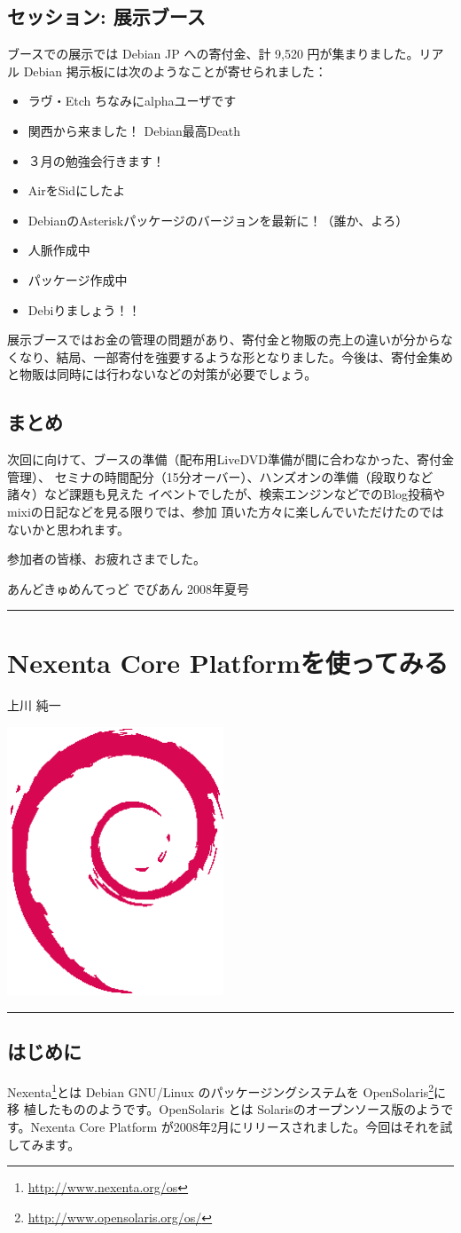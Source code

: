 \documentclass[mingoth,a4paper]{jsarticle}
\renewcommand{\dancersection}[2]{%
\newpage
あんどきゅめんてっど でびあん 2008年夏号
%
\vspace{0.1mm}\\
{\color{dancerlightblue}\rule{\hsize}{2mm}}

%
%
\begin{minipage}[t]{0.6\hsize}
\color{dancerdarkblue}
\vspace{1cm}
\section{#1}
\hfill{}#2\\
\end{minipage}
\begin{minipage}[t]{0.4\hsize}
\vspace{-2cm}
\hfill{}\includegraphics[height=8cm]{image200502/openlogo-nd.eps}\\
\vspace{-5cm}
\end{minipage}
%
%
{\color{dancerdarkblue}\rule{0.74\hsize}{2mm}}
%
\vspace{2cm}
}
\begin{document}
\subsection{セッション: 展示ブース}
ブースでの展示では Debian JP への寄付金、計 9,520 円が集まりました。リアル Debian 掲示板には次のようなことが寄せられました：
\begin{multicols}{2}
 
 \begin{itemize}
    \item ラヴ・Etch ちなみにalphaユーザです
    \item 関西から来ました！ Debian最高Death
    \item ３月の勉強会行きます！
    \item AirをSidにしたよ
    \item DebianのAsteriskパッケージのバージョンを最新に！（誰か、よろ）
    \item 人脈作成中
    \item パッケージ作成中
    \item Debiりましょう！！
 \end{itemize}
\end{multicols}

展示ブースではお金の管理の問題があり、寄付金と物販の売上の違いが分からなくなり、結局、一部寄付を強要するような形となりました。今後は、寄付金集めと物販は同時には行わないなどの対策が必要でしょう。


\subsection{まとめ}
次回に向けて、ブースの準備（配布用LiveDVD準備が間に合わなかった、寄付金管理）、
セミナの時間配分（15分オーバー）、ハンズオンの準備（段取りなど諸々）など課題も見えた
イベントでしたが、検索エンジンなどでのBlog投稿やmixiの日記などを見る限りでは、参加
頂いた方々に楽しんでいただけたのではないかと思われます。

参加者の皆様、お疲れさまでした。



\dancersection{Nexenta Core Platformを使ってみる}{上川 純一}
\label{sec:nexentacore}

\subsection{はじめに}

Nexenta\footnote{\url{http://www.nexenta.org/os}}とは Debian GNU/Linux のパッケージングシステムを OpenSolaris\footnote{\url{http://www.opensolaris.org/os/}}に移
植したもののようです。OpenSolaris とは Solarisのオープンソース版のようで
す。Nexenta Core Platform が2008年2月にリリースされました。今回はそれを試
してみます。
\end{document}
